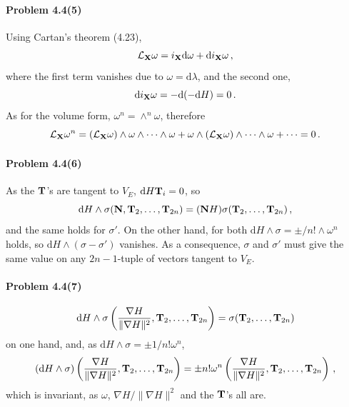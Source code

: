 \documentclass[a4paper,12pt]{article}
\def\d{\mathrm{d}}
\newcommand{\problem}[1]{\paragraph{Problem #1}}
\begin{document}

\problem{4.4(5)} Using Cartan's theorem (4.23),
\[
 \mathcal{L}_{\bf X}\omega = i_{\bf X}\d \omega + \d i_{\bf X}\omega\,,
\]
where the first term vanishes due to $\omega = \d \lambda$, and the second one,
\[
 \d i_{\bf X}\omega = -\d (-\d H) = 0\,.
\]
As for the volume form, $\omega^n = \wedge^n \omega$, therefore
\[
 \mathcal{L}_{\bf X}\omega^n = (\mathcal{L}_{\bf X}\omega)
 \wedge \omega \wedge\dots\wedge\omega + \omega\wedge(\mathcal{L}_{\bf X}\omega)
 \wedge\dots\wedge\omega+\dots =0\,.
\]


\problem{4.4(6)} As the ${\bf T}$'s are tangent to $V_E$, $\d H {\bf T}_i = 0$, so
\[
 \d H \wedge \sigma ({\bf N}, {\bf T}_2,\dots,{\bf T}_{2n}) = ({\bf N}H)\sigma({\bf T}_2, \dots, {\bf T}_{2n})\,,
\]
and the same holds for $\sigma'$. On the other hand,
for both $\d H \wedge \sigma = \pm/n! \wedge\omega^n$ holds, so $\d H \wedge (\sigma-\sigma')$ vanishes. As a consequence, $\sigma$ and $\sigma'$ must give the same value on any $2n-1$-tuple of vectors tangent to $V_E$.


\problem{4.4(7)}
\[
 \d H \wedge \sigma \left( \frac{\nabla H}{\|\nabla H\|^2},{\bf T}_2,\dots,{\bf T}_{2n}\right) = \sigma({\bf T}_2,\dots,{\bf T}_{2n})
\]
on one hand, and, as $\d H \wedge \sigma = \pm 1/n! \omega^n$,
\[
(\d H \wedge \sigma) \left( \frac{\nabla H}{\|\nabla H\|^2},{\bf T}_2,\dots,{\bf T}_{2n}\right) = \pm n!
 \omega^n\left( \frac{\nabla H}{\|\nabla H\|^2},{\bf T}_2,\dots,{\bf T}_{2n}\right)\,,
\]
which is invariant, as $\omega$, $\nabla H/\|\nabla H\|^2$ and the ${\bf T}$'s all are.

\end{document}
